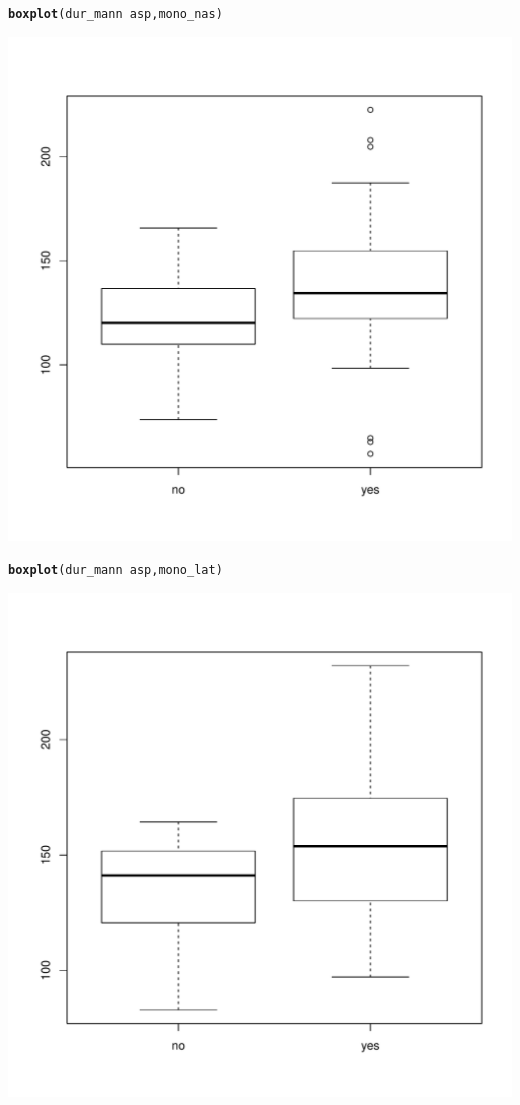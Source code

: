 \documentclass[a4paper,11pt]{article}\usepackage[]{graphicx}\usepackage[]{color}
\makeatletter
\def\maxwidth{ %
  \ifdim\Gin@nat@width>\linewidth
    \linewidth
  \else
    \Gin@nat@width
  \fi
}
\newcommand{\hlopt}[1]{\textcolor[rgb]{0,0,0}{#1}}%
\newcommand{\hlstd}[1]{\textcolor[rgb]{0.345,0.345,0.345}{#1}}%
\newcommand{\hlkwd}[1]{\textcolor[rgb]{0.737,0.353,0.396}{\textbf{#1}}}%
\newenvironment{kframe}{%
 \def\at@end@of@kframe{}%
 \ifinner\ifhmode%
  \def\at@end@of@kframe{\end{minipage}}%
  \begin{minipage}{\columnwidth}%
 \fi\fi%
 \def\FrameCommand##1{\hskip\@totalleftmargin \hskip-\fboxsep
 \colorbox{shadecolor}{##1}\hskip-\fboxsep
     \hskip-\linewidth \hskip-\@totalleftmargin \hskip\columnwidth}%
 \MakeFramed {\advance\hsize-\width
   \@totalleftmargin\z@ \linewidth\hsize
   \@setminipage}}%
 {\par\unskip\endMakeFramed%
 \at@end@of@kframe}
\newenvironment{knitrout}{}{} %
\makeatother
\begin{document}
\begin{knitrout}
\begin{kframe}
\begin{alltt}
\hlkwd{boxplot}\hlstd{(dur_mann} \hlopt{~} \hlstd{asp, mono_nas)}
\end{alltt}
\end{kframe}
\includegraphics[width=\maxwidth]{img/unnamed-chunk-24-1} 
\begin{kframe}\begin{alltt}
\hlkwd{boxplot}\hlstd{(dur_mann} \hlopt{~} \hlstd{asp, mono_lat)}
\end{alltt}
\end{kframe}
\includegraphics[width=\maxwidth]{img/unnamed-chunk-24-2} 

\end{knitrout}
\end{document}
